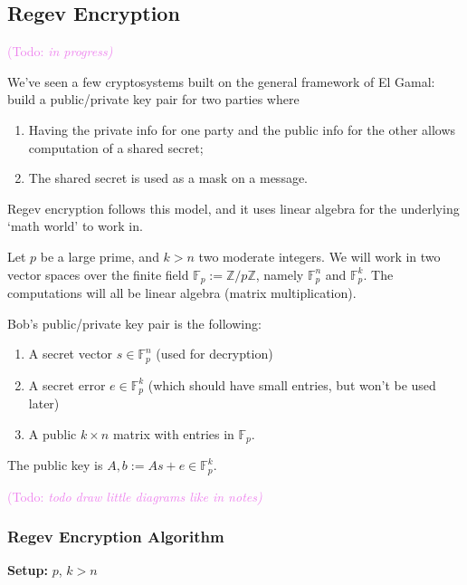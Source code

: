 \documentclass{article}
\theoremstyle{plain}
\theoremstyle{definition}
\theoremstyle{remark}
\numberwithin{theorem}{section}
\newcommand{\KS}[1]{\textcolor{violet}{{\sf (Todo:} {\sl{#1})}}}
\newcommand{\KS}[1]{}
\newcommand{\FF}{\mathbb{F}}
\newcommand{\ZZ}{\mathbb{Z}}
\begin{document}
\subsection{Regev Encryption}

\KS{in progress}

We've seen a few cryptosystems built on the general framework of El Gamal:  build a public/private key pair for two parties where
\begin{enumerate}
    \item Having the private info for one party and the public info for the other allows computation of a shared secret;
    \item The shared secret is used as a mask on a message.
\end{enumerate}

Regev encryption follows this model, and it uses linear algebra for the underlying `math world' to work in.

Let $p$ be a large prime, and $k > n$ two moderate integers.  We will work in two vector spaces over the finite field $\FF_p := \ZZ/p\ZZ$, namely $\FF_p^n$ and $\FF_p^k$.  The computations will all be linear algebra (matrix multiplication).

Bob's public/private key pair is the following:
\begin{enumerate}
    \item A secret vector $s \in \FF_p^n$ (used for decryption)
    \item A secret error $e \in \FF_p^k$ (which should have small entries, but won't be used later)
    \item A public $k \times n$ matrix with entries in $\FF_p$.
\end{enumerate}

The public key is $A, b:= As + e \in \FF_p^k$.

\KS{todo draw little diagrams like in notes}

\subsubsection{Regev Encryption Algorithm}

     {\bf Setup:}  $p$, $k > n$
     \vspace{1em}
\end{document}
